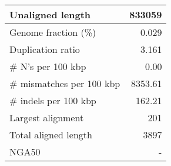 \documentclass[12pt,a4paper]{article}
\begin{document}
\begin{table}[ht]
\begin{center}
\begin{tabular}{|l*{1}{|r}|}
Unaligned length & 833059 \\ \hline
Genome fraction (\%) & 0.029 \\ \hline
Duplication ratio & 3.161 \\ \hline
\# N's per 100 kbp & 0.00 \\ \hline
\# mismatches per 100 kbp & 8353.61 \\ \hline
\# indels per 100 kbp & 162.21 \\ \hline
Largest alignment & 201 \\ \hline
Total aligned length & 3897 \\ \hline
NGA50 & - \\ \hline
\end{tabular}
\end{center}
\end{table}
\end{document}
